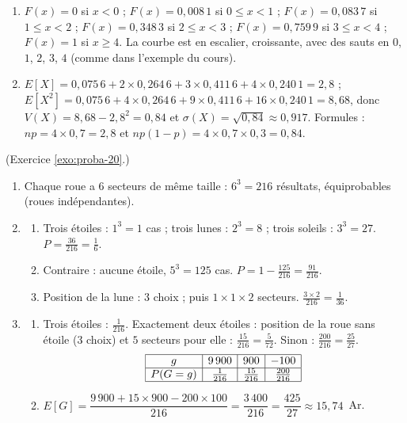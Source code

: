 \begin{corrige}
\begin{sol}
\begin{enumerate}
\item $F(x) = 0$ si $x < 0$ ; $F(x) = 0,008\,1$ si $0\le x<1$ ; $F(x) = 0,083\,7$ si $1\le x<2$ ;
      $F(x) = 0,348\,3$ si $2\le x<3$ ; $F(x) = 0,759\,9$ si $3\le x<4$ ; $F(x) = 1$ si $x\geq 4$.
      La courbe est en escalier, croissante, avec des sauts en $0$, $1$, $2$, $3$, $4$ (comme dans l'exemple du cours).
\item $E[X] = 0,075\,6 + 2\times 0,264\,6 + 3\times 0,411\,6 + 4\times 0,240\,1 = 2,8$ ;
      $E[X^2] = 0,075\,6 + 4\times 0,264\,6 + 9\times 0,411\,6 + 16\times 0,240\,1 = 8,68$, donc
      $V(X) = 8,68 - 2,8^2 = 0,84$ et $\sigma(X) = \sqrt{0,84}\approx 0,917$.
      Formules : $np = 4\times 0,7 = 2,8$ et $np(1-p) = 4\times 0,7\times 0,3 = 0,84$.
\end{enumerate}
\end{sol}
%
\begin{sol} (Exercice \ref{exo:proba-20}.)
\begin{enumerate}
\item Chaque roue a $6$ secteurs de m\^eme taille : $6^3 = 216$ r\'esultats, \'equiprobables (roues ind\'ependantes).
\item \begin{enumerate}
      \item Trois \'etoiles : $1^3 = 1$ cas ; trois lunes : $2^3 = 8$ ; trois soleils : $3^3 = 27$.
            $P = \frac{36}{216} = \frac{1}{6}$.
      \item Contraire : aucune \'etoile, $5^3 = 125$ cas. $P = 1 - \frac{125}{216} = \frac{91}{216}$.
      \item Position de la lune : $3$ choix ; puis $1\times 1\times 2$ secteurs. $\frac{3\times 2}{216} = \frac{1}{36}$.
      \end{enumerate}
\item \begin{enumerate}
      \item Trois \'etoiles : $\frac{1}{216}$. Exactement deux \'etoiles : position de la roue sans \'etoile ($3$ choix) et $5$ secteurs pour elle :
            $\frac{15}{216} = \frac{5}{72}$. Sinon : $\frac{200}{216} = \frac{25}{27}$.
            \[
            \begin{array}{|c|c|c|c|}
            \hline
            g & 9\,900 & 900 & -100 \\ \hline
            P(G = g) & \frac{1}{216} & \frac{15}{216} & \frac{200}{216} \\ \hline
            \end{array}
            \]
      \item $E[G] = \dfrac{9\,900 + 15\times 900 - 200\times 100}{216} = \dfrac{3\,400}{216} = \dfrac{425}{27}\approx 15,74$~Ar.

\end{enumerate}
\end{enumerate}
\end{sol}
\end{corrige}
